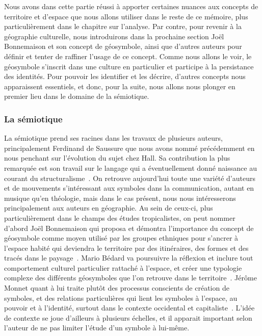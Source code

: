 Nous avons dans cette partie réussi à apporter certaines nuances aux concepts de territoire et d'espace que nous allons utiliser dans le reste de ce mémoire, plus particulièrement dans le chapitre sur l'analyse.
Par contre, pour revenir à la géographie culturelle, nous introduirons dans la prochaine section Joël Bonnemaison et son concept de géosymbole, ainsi que d'autres auteurs pour définir et tenter de raffiner l'usage de ce concept.
Comme nous allons le voir, le géosymbole s'inscrit dans une culture en particulier et participe à la persistance des identités. 
Pour pouvoir les identifier et les décrire, d'autres concepts nous apparaissent essentiels, et donc, pour la suite, nous allons nous plonger en premier lieu dans le domaine de la sémiotique.

\subsubsection{La sémiotique}
\label{ssub:la_semiotique}  La sémiotique prend ses racines dans les travaux de plusieurs auteurs, principalement Ferdinand de Saussure que nous avons nommé précédemment en nous penchant sur l'évolution du sujet chez Hall.
Sa contribution la plus remarquée est son travail sur le langage qui a éventuellement donné naissance au courant du structuralisme~\citep{Noth1995}.
On retrouve aujourd'hui toute une variété d'auteurs et de mouvements s'intéressant aux symboles dans la communication, autant en musique qu'en théologie, mais dans le cas présent, nous nous intéresserons principalement aux auteurs en géographie.
Au sein de ceux-ci, plus particulièrement dans le champs des études tropicalistes, on peut nommer d'abord Joël Bonnemaison qui proposa et démontra l'importance du concept de géosymbole comme moyen utilisé par les groupes ethniques pour s'ancrer à l'espace habité qui deviendra le territoire par des itinéraires, des formes et des tracés dans le paysage~\citep{Bonnemaison1981}.
Mario Bédard va poursuivre la réflexion et inclure tout comportement culturel particulier rattaché à l'espace, et créer une typologie complexe des différents géosymboles que l'on retrouve dans le territoire~\citep{Bedard2002}.
Jérôme Monnet quant à lui traite plutôt des processus conscients de création de symboles, et des relations particulières qui lient les symboles à l'espace, au pouvoir et à l'identité, surtout dans le contexte occidental et capitaliste~\citep{Monnet1998}.
L'idée de contexte se joue d'ailleurs à plusieurs échelles, et il apparait important selon l'auteur de ne pas limiter l'étude d'un symbole à lui-même.

